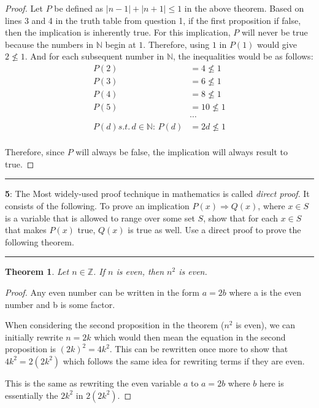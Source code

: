 \documentclass[11pt]{article}
\newtheorem{theorem}{Theorem}
\newcommand\question[2]{\vspace{.25in}\hrule\textbf{#1}: #2\vspace{.5em}\hrule\vspace{.10in}}
\newcommand{\N}{\mathbb{N}}
\newcommand{\Z}{\mathbb{Z}}
\begin{document}
	\begin{proof}
		Let $P$ be defined as $|n-1|+|n+1| \le 1$ in the above theorem.
		Based on lines 3 and 4 in the truth table from question 1, if the first proposition if false, then the implication is inherently true. For this implication, $P$ will never be true because the numbers in $\N$ begin at $1$. Therefore, using $1$ in $P(1)$ would give $2 \nleq 1$. And for each subsequent number in $\N$, the inequalities would be as follows:
		\begin{align*}
			P(2) &= 4 \nleq 1\\
			P(3) &= 6 \nleq 1\\
			P(4) &= 8 \nleq 1\\
			P(5) &= 10 \nleq 1\\
			&\cdots\\
			P(d) s.t. \, d \in \N: \, P(d) &= 2d \nleq 1\\
		\end{align*}

		Therefore, since $P$ will always be false, the implication will always result to true.
	\end{proof}

\question{5}{The Most widely-used proof technique in mathematics is called \textit{direct proof}. It consists of the following. To prove an implication $P(x) \Rightarrow Q(x)$, where $x \in S$ is a variable that is allowed to range over some set $S$, show that for each $x \in S$ that makes $P(x)$ true, $Q(x)$ is true as well. Use a direct proof to prove the following theorem.}
	\begin{theorem}
		Let $n \in \Z$. If $n$ is even, then $n^2$ is even.
	\end{theorem}

	\begin{proof}
		Any even number can be written in the form $a=2b$ where a is the even number and b is some factor. 

		When considering the second proposition in the theorem ($n^2$ is even), we can initially rewrite $n = 2k$ which would then mean the equation in the second proposition is $(2k)^2 = 4k^2$. This can be rewritten once more to show that $4k^2 = 2(2k^2)$ which follows the same idea for rewriting terms if they are even. 

		This is the same as rewriting the even variable $a$ to $a=2b$ where $b$ here is essentially the $2k^2$ in $2(2k^2)$.
	\end{proof}
\end{document}
